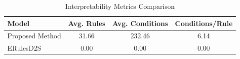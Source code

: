 \begin{table}[htbp]
\centering
\caption{Interpretability Metrics Comparison}
\label{tab:complexity}
\begin{tabular}{lccc}
\toprule
Model & Avg. Rules & Avg. Conditions & Conditions/Rule \\
\midrule
Proposed Method & 31.66 & 232.46 & 6.14 \\
ERulesD2S & 0.00 & 0.00 & 0.00 \\
\bottomrule
\end{tabular}
\end{table}